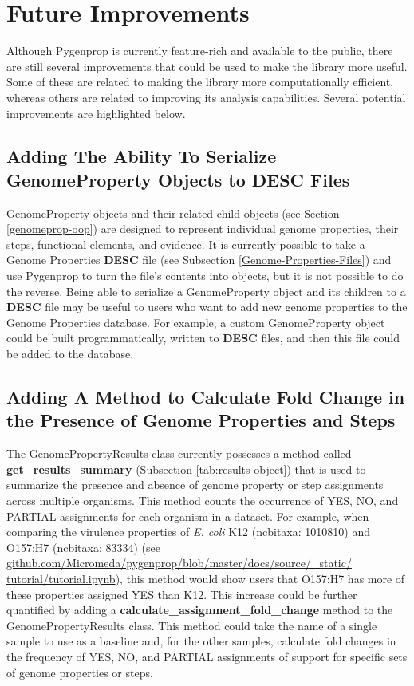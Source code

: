 \section{Future Improvements}

Although Pygenprop is currently feature-rich and available to the public, there 
are still several improvements that could be used to make the library more 
useful. Some of these are related to making the library more computationally 
efficient, whereas others are related to improving its analysis capabilities. 
Several potential improvements are highlighted below.

\subsection{Adding The Ability To Serialize GenomeProperty Objects to DESC 
Files}

GenomeProperty objects and their related child objects (see Section 
\ref{genomeprop-oop}) are designed to represent individual genome properties, 
their steps, functional elements, and evidence. It is currently possible to take 
a Genome Properties \textbf{DESC} file (see Subsection 
\ref{Genome-Properties-Files}) and use Pygenprop to turn the file's contents 
into objects, but it is not possible to do the reverse. Being able to serialize 
a GenomeProperty object and its children to a \textbf{DESC} file may be useful 
to users who want to add new genome properties to the Genome Properties 
database. For example, a custom GenomeProperty object could be built 
programmatically, written to \textbf{DESC} files, and then this file could be 
added to the database.

\subsection{Adding A Method to Calculate Fold Change in the Presence of Genome 
Properties and Steps}

The GenomePropertyResults class currently possesses a method called 
\textbf{get\_results\_summary} (Subsection \ref{tab:results-object}) that is 
used to summarize the presence and absence of genome property or step 
assignments across multiple organisms. This method counts the occurrence of YES, 
NO, and PARTIAL assignments for each organism in a dataset. For example, when 
comparing the virulence properties of \textit{E. coli} K12 (\gls{ncbitaxa}: 
1010810) and O157:H7 (\gls{ncbitaxa}: 83334) (see 
\href{http://github.com/Micromeda/pygenprop/blob/master/docs/source/_static/tutorial/tutorial.ipynb}{github.com/Micromeda/pygenprop/blob/master/docs/source/\_static/ 
tutorial/tutorial.ipynb}), this method would show users that O157:H7 has more of 
these properties assigned YES than K12. This increase could be further 
quantified by adding a \textbf{calculate\_assignment\_fold\_change} method to 
the GenomePropertyResults class. This method could take the name of a single 
sample to use as a baseline and, for the other samples, calculate fold changes 
in the frequency of YES, NO, and PARTIAL assignments of support for specific 
sets of genome properties or steps.

